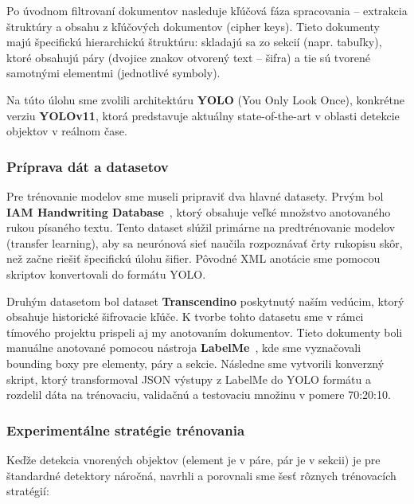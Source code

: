 Po úvodnom filtrovaní dokumentov nasleduje kľúčová fáza spracovania – extrakcia štruktúry a obsahu z kľúčových dokumentov (cipher keys). Tieto dokumenty majú špecifickú hierarchickú štruktúru: skladajú sa zo sekcií (napr. tabuľky), ktoré obsahujú páry (dvojice znakov otvorený text – šifra) a tie sú tvorené samotnými elementmi (jednotlivé symboly).

Na túto úlohu sme zvolili architektúru \textbf{YOLO} (You Only Look Once), konkrétne verziu \textbf{YOLOv11}, ktorá predstavuje aktuálny state-of-the-art v oblasti detekcie objektov v reálnom čase.

\subsubsection{Príprava dát a datasetov}

Pre trénovanie modelov sme museli pripraviť dva hlavné datasety. Prvým bol \textbf{IAM Handwriting Database}~\cite{iam_database}, ktorý obsahuje veľké množstvo anotovaného rukou písaného textu. Tento dataset slúžil primárne na predtrénovanie modelov (transfer learning), aby sa neurónová sieť naučila rozpoznávať črty rukopisu skôr, než začne riešiť špecifickú úlohu šifier. Pôvodné XML anotácie sme pomocou skriptov konvertovali do formátu YOLO.

Druhým datasetom bol dataset \textbf{Transcendino} poskytnutý naším vedúcim, ktorý obsahuje historické šifrovacie kľúče. K tvorbe tohto datasetu sme v rámci tímového projektu prispeli aj my anotovaním dokumentov. Tieto dokumenty boli manuálne anotované pomocou nástroja \textbf{LabelMe}~\cite{labelme}, kde sme vyznačovali bounding boxy pre elementy, páry a sekcie. Následne sme vytvorili konverzný skript, ktorý transformoval JSON výstupy z LabelMe do YOLO formátu a rozdelil dáta na trénovaciu, validačnú a testovaciu množinu v pomere 70:20:10.

\subsubsection{Experimentálne stratégie trénovania}

Keďže detekcia vnorených objektov (element je v páre, pár je v sekcii) je pre štandardné detektory náročná, navrhli a porovnali sme šesť rôznych trénovacích stratégií:

